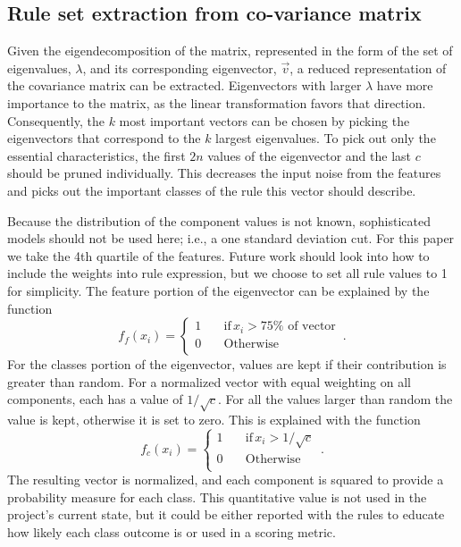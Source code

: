\documentclass[10pt]{article}
\begin{document}
\subsection{Rule set extraction from co-variance matrix}
Given the eigendecomposition of the matrix, represented in the form of the set of eigenvalues, $\lambda$, and its corresponding eigenvector, $\vec{v}$, a reduced representation of the covariance matrix can be extracted. Eigenvectors with larger $\lambda$ have more importance to the matrix, as the linear transformation favors that direction. Consequently, the $k$ most important vectors can be chosen by picking the eigenvectors that correspond to the $k$ largest eigenvalues. To pick out only the essential characteristics, the first $2n$ values of the eigenvector and the last $c$ should be pruned individually. This decreases the input noise from the features and picks out the important classes of the rule this vector should describe. 

Because the distribution of the component values is not known, sophisticated models should not be used here; i.e., a one standard deviation cut. For this paper we take the 4th quartile of the features. Future work should look into how to include the weights into rule expression, but we choose to set all rule values to 1 for simplicity. The feature portion of the eigenvector can be explained by the function
\begin{equation}
f_f(x_i)=\begin{cases}
          1 \quad &\text{if} \, x_i > 75\% \text{ of vector} \\
          0 \quad &\text{Otherwise} \\
     \end{cases} \, .
\end{equation}
For the classes portion of the eigenvector, values are kept if their contribution is greater than random. For a normalized vector with equal weighting on all components, each has a value of $1/\sqrt{c}$. For all the values larger than random the value is kept, otherwise it is set to zero. This is explained with the function
\begin{equation}
f_c(x_i)=\begin{cases}
          1 \quad &\text{if} \, x_i > 1/\sqrt{c} \\
          0 \quad &\text{Otherwise} \\
     \end{cases} \, .
\end{equation}
The resulting vector is normalized, and each component is squared to provide a probability measure for each class. This quantitative value is not used in the project's current state, but it could be either reported with the rules to educate how likely each class outcome is or used in a scoring metric.
\end{document}
